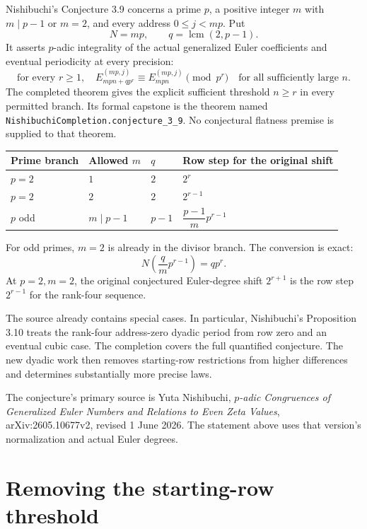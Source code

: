 Nishibuchi's Conjecture 3.9 concerns a prime $p$, a positive integer $m$ with
$m\mid p-1$ or $m=2$, and every address $0\le j<mp$. Put
\[
 N=mp, \qquad q=\operatorname{lcm}(2,p-1).
\]
It asserts $p$-adic integrality of the actual generalized Euler coefficients and
eventual periodicity at every precision:
\[
 \text{for every }r\ge1,\quad
 E_{mpn+qp^r}^{(mp,j)}\equiv E_{mpn}^{(mp,j)}\pmod {p^r}
 \quad\text{for all sufficiently large }n.
\]
The completed theorem gives the explicit sufficient threshold $n\ge r$ in
every permitted branch. Its formal capstone is the theorem named
\texttt{NishibuchiCompletion.conjecture\_3\_9}. No conjectural flatness premise
is supplied to that theorem.

\begin{center}
\begin{tabular}{llll}
\toprule
Prime branch & Allowed $m$ & $q$ & Row step for the original shift \\
\midrule
$p=2$ & $1$ & $2$ & $2^r$ \\
$p=2$ & $2$ & $2$ & $2^{r-1}$ \\
$p$ odd & $m\mid p-1$ & $p-1$ & $\dfrac{p-1}{m}p^{r-1}$ \\
\bottomrule
\end{tabular}
\end{center}

For odd primes, $m=2$ is already in the divisor branch. The conversion is exact:
\[
 N\left(\frac qm p^{r-1}\right)=qp^r.
\]
At $p=2,m=2$, the original conjectured Euler-degree shift $2^{r+1}$ is the row
step $2^{r-1}$ for the rank-four sequence.

The source already contains special cases. In particular, Nishibuchi's
Proposition 3.10 treats the rank-four address-zero dyadic period from row zero
and an eventual cubic case. The completion covers the full quantified
conjecture. The new dyadic work then removes starting-row restrictions from
higher differences and determines substantially more precise laws.

The conjecture's primary source is Yuta Nishibuchi, \emph{$p$-adic Congruences of
Generalized Euler Numbers and Relations to Even Zeta Values},
arXiv:2605.10677v2, revised 1 June 2026. The statement above uses that version's
normalization and actual Euler degrees.

\clearpage
\section{Removing the starting-row threshold}

